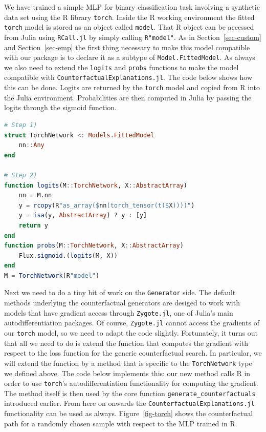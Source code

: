 \documentclass[
  letterpaper,
  DIV=11,
  numbers=noendperiod]{scrartcl}
\begin{document}
We have trained a simple MLP for binary classification task involving a
synthetic data set using the R library \texttt{torch}. Inside the R
working environment the fitted \texttt{torch} model is stored as an
object called \texttt{model}. That R object can be accessed from Julia
using \texttt{RCall.jl} by simply calling \texttt{R"model"}. As in
Section~\ref{sec-custom} and Section~\ref{sec-emp} the first thing
necessary to make this model compatible with our package is to declare
it as a subtype of \texttt{Model.FittedModel}. As always we also need to
extend the \texttt{logits} and \texttt{probs} functions to make the
model compatible with \texttt{CounterfactualExplanations.jl}. The code
below shows how this can be done. Logits are returned by the
\texttt{torch} model and copied from R into the Julia environment.
Probabilities are then computed in Julia by passing the logits through
the sigmoid function.

\begin{lstlisting}[language=Julia]
# Step 1)
struct TorchNetwork <: Models.FittedModel
    nn::Any
end

# Step 2)
function logits(M::TorchNetwork, X::AbstractArray)
    nn = M.nn
    y = rcopy(R"as_array($nn(torch_tensor(t($X))))")
    y = isa(y, AbstractArray) ? y : [y]
    return y
end
function probs(M::TorchNetwork, X::AbstractArray)
    Flux.sigmoid.(logits(M, X))
end
M = TorchNetwork(R"model")
\end{lstlisting}

Next we need to do a tiny bit of work on the \texttt{Generator} side.
The default methods underlying the counterfactual generators are desiged
to work with models that have gradient access through
\texttt{Zygote.jl}, one of Julia's main autodifferentiation packages. Of
course, \texttt{Zygote.jl} cannot access the gradients of our
\texttt{torch} model, so we need to adapt the code slightly.
Fortunately, it turns out that all we need to do is extend the function
that computes the gradient with respect to the loss function for the
generic counterfactual search. In particular, we will extend the
function by a method that is specific to the \texttt{TorchNetwork} type
we defined above. The code below implements this: our new method calls R
in order to use \texttt{torch}'s autodifferentiation functionality for
computing the gradient. The method itself is then used by the core
function \texttt{generate\_counterfactuals} introduced earlier. From
here on onwards the \texttt{CounterfactualExplanations.jl} functionality
can be used as always. Figure~\ref{fig-torch} shows the counterfactual
path for a randomly chosen sample with respect to the MLP trained in R.
\end{document}
